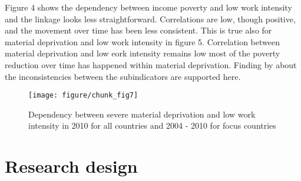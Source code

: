 \documentclass[11pt, a4paper]{article}\usepackage{graphicx, color}
\makeatletter
\def\maxwidth{ %
  \ifdim\Gin@nat@width>\linewidth
    \linewidth
  \else
    \Gin@nat@width
  \fi
}
\newenvironment{knitrout}{}{} %
\makeatother
\begin{document}
Figure 4 shows the dependency between income poverty and low work intensity and the linkage looks less straightforward. Correlations are low, though positive, and the movement over time has been less consistent. This is true also for material deprivation and low work intensity in figure 5. Correlation between  material deprivation and low eork intensity remains low most of the poverty reduction over time has happened within material deprivation. Finding by \citet{nolan_eu_2011} about the inconsistencies between the subindicators are supported here.


\begin{knitrout}
\color{fgcolor}\begin{figure}[H]
\texttt{[image: figure/chunk\_fig7]} \caption[Dependency between severe material deprivation and low work intensity in 2010 for all countries and 2004 - 2010 for focus countries]{Dependency between severe material deprivation and low work intensity in 2010 for all countries and 2004 - 2010 for focus countries\label{fig:chunk_fig7}}
\end{figure}

\end{knitrout}








\newpage
\section{Research design}
\end{document}
